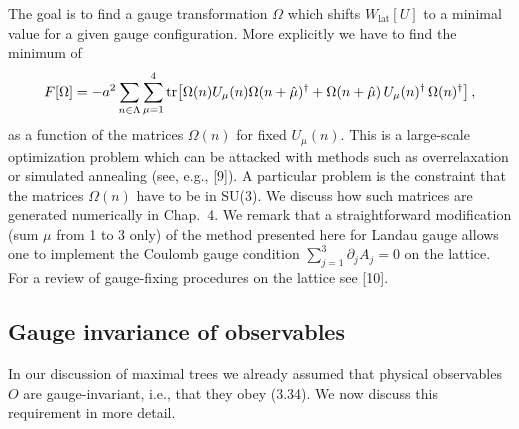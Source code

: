 The goal is to find a gauge transformation $\Omega$ which shifts
$W_{\mathrm{lat}}[U]$ to a minimal value for a given gauge configuration. More
explicitly we have to find the minimum of
\begin{equation}
  F[\Omega] = -a^2\sum_{n\in\Lambda}\sum_{\mu=1}^{4}
    \operatorname{tr}\!\left[\Omega(n)U_\mu(n)\Omega(n+\hat\mu)^\dagger
    + \Omega(n+\hat\mu)\,U_\mu(n)^\dagger\,\Omega(n)^\dagger\right] ,
\end{equation}
as a function of the matrices $\Omega(n)$ for fixed $U_\mu(n)$. This is a
large-scale optimization problem which can be attacked with methods such as
overrelaxation or simulated annealing (see, e.g., [9]). A particular problem is
the constraint that the matrices $\Omega(n)$ have to be in SU(3). We discuss
how such matrices are generated numerically in Chap.~4. We remark that a
straightforward modification (sum $\mu$ from 1 to 3 only) of the method
presented here for Landau gauge allows one to implement the Coulomb gauge
condition $\sum_{j=1}^{3}\partial_j A_j = 0$ on the lattice. For a review of
gauge-fixing procedures on the lattice see [10].

\subsection{Gauge invariance of observables}

In our discussion of maximal trees we already assumed that physical observables
$O$ are gauge-invariant, i.e., that they obey (3.34). We now discuss this
requirement in more detail.

